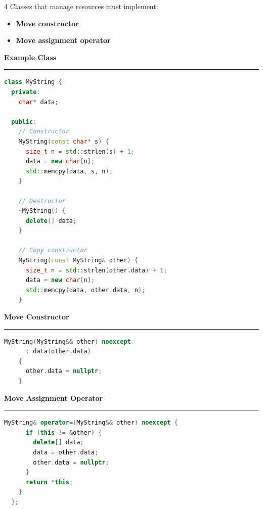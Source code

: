 \documentclass[final]{beamer}
\renewcommand{\subsection}[1]{%
  \par\vspace{1em}%
  {\noindent\large\bfseries #1\par}%
  \vspace{0.5em}\hrule\vspace{1em}%
}
\begin{document}
\begin{frame}[t,fragile]
\begin{multicols}{4}
  Classes that manage resources must implement:

  \begin{itemize}
    \item \textbf{Move constructor}
    \item \textbf{Move assignment operator}
  \end{itemize}

  \subsection{Example Class}

  \begin{lstlisting}[language=C++]
  class MyString {
  private:
    char* data;

  public:
    // Constructor
    MyString(const char* s) {
      size_t n = std::strlen(s) + 1;
      data = new char[n];
      std::memcpy(data, s, n);
    }

    // Destructor
    ~MyString() {
      delete[] data;
    }

    // Copy constructor
    MyString(const MyString& other) {
      size_t n = std::strlen(other.data) + 1;
      data = new char[n];
      std::memcpy(data, other.data, n);
    }
  \end{lstlisting}

  \subsection{Move Constructor}

  \begin{lstlisting}[language=C++]
    MyString(MyString&& other) noexcept
      : data(other.data)
    {
      other.data = nullptr;
    }
  \end{lstlisting}

  \subsection{Move Assignment Operator}

  \begin{lstlisting}[language=C++]
    MyString& operator=(MyString&& other) noexcept {
      if (this != &other) {
        delete[] data;
        data = other.data;
        other.data = nullptr;
      }
      return *this;
    }
  };
  \end{lstlisting}
 
 
\end{multicols}

\end{frame}
\end{document}
